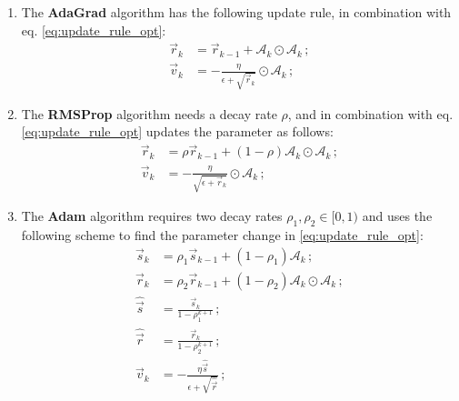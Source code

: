 \begin{enumerate}[leftmargin=0pt,labelwidth=!,labelsep=.05em]
    \item[] The \textbf{AdaGrad} algorithm has the following update rule, in combination with eq. \eqref{eq:update_rule_opt}:
    \begin{subequations}\label{eq:adagrad_algo}
    \begin{align}
        \vec{r}_{k} &= \vec{r}_{k-1} + \mathcal{A}_k \odot \mathcal{A}_k \,;\\
        \vec{v}_{k} &= -\frac{\eta}{\epsilon + \sqrt{\vec{r}_k}} \odot \mathcal{A}_k \,;\label{eq:v_ada}
    \end{align}
    \end{subequations}
    \item[] The \textbf{RMSProp} algorithm needs a decay rate $\rho$, and in combination with eq. \eqref{eq:update_rule_opt} updates the parameter as follows:
    \begin{subequations}\label{eq:rmsprop_algo}
    \begin{align}
        \vec{r}_{k} &= \rho \vec{r}_{k-1} + (1-\rho)\mathcal{A}_k \odot \mathcal{A}_k\,; \\
        \vec{v}_{k} &= -\frac{\eta}{\sqrt{\epsilon + \vec{r}_k}} \odot \mathcal{A}_k\,;\label{eq:v_rms}
    \end{align}
    \end{subequations}
    \item[] The \textbf{Adam} algorithm requires two decay rates $\rho_1, \rho_2 \in [0, 1)$ and uses the following scheme to find the parameter change in \eqref{eq:update_rule_opt}:
    \begin{subequations}\label{eq:adam_algo}
    \begin{align}
        \vec{s}_{k} &= \rho_1 \vec{s}_{k-1} + (1-\rho_1)\mathcal{A}_k\,; \\
        \vec{r}_{k} &= \rho_2 \vec{r}_{k-1} + (1-\rho_2)\mathcal{A}_k \odot \mathcal{A}_k\,; \\
        \hat{\vec{s}} &= \frac{\vec{s}_k}{1-\rho_1^{k+1}}\,; \\
        \hat{\vec{r}} &= \frac{\vec{r}_k}{1-\rho_2^{k+1}}\,; \\
        \vec{v}_{k} &= -\frac{\eta \hat{\vec{s}}}{\epsilon+\sqrt{\hat{\vec{r}}}} \,; \label{eq:v_adam}
    \end{align}
    \end{subequations}
\end{enumerate}


